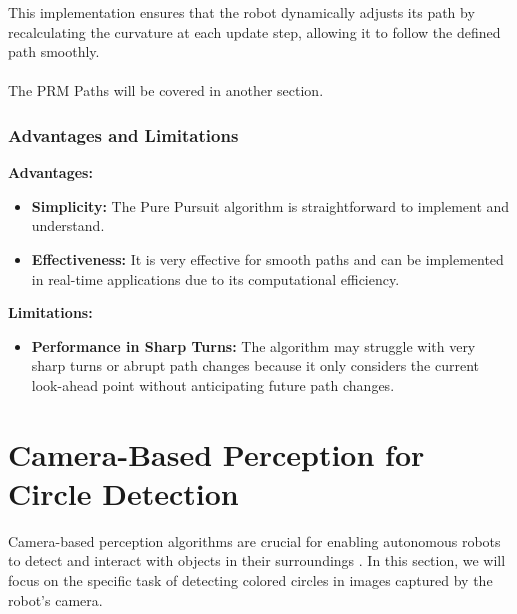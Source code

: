 \documentclass{article}
\begin{document}
	This implementation ensures that the robot dynamically adjusts its path by recalculating the curvature at each update step, allowing it to follow the defined path smoothly.
	\\\\
	\noindent The PRM Paths will be covered in another section.
	
	
	\subsubsection*{Advantages and Limitations}
	\textbf{Advantages:}
	\begin{itemize}
		\item \textbf{Simplicity:} The Pure Pursuit algorithm is straightforward to implement and understand.
		\item \textbf{Effectiveness:} It is very effective for smooth paths and can be implemented in real-time applications due to its computational efficiency.
	\end{itemize}
	\textbf{Limitations:}
	\begin{itemize}
		\item \textbf{Performance in Sharp Turns:} The algorithm may struggle with very sharp turns or abrupt path changes because it only considers the current look-ahead point without anticipating future path changes.
	\end{itemize}
	
	
	\section{Camera-Based Perception for Circle Detection}
	Camera-based perception algorithms are crucial for enabling autonomous robots to detect and interact with objects in their surroundings \cite{corke2017}. In this section, we will focus on the specific task of detecting colored circles in images captured by the robot's camera.
	
\end{document}
